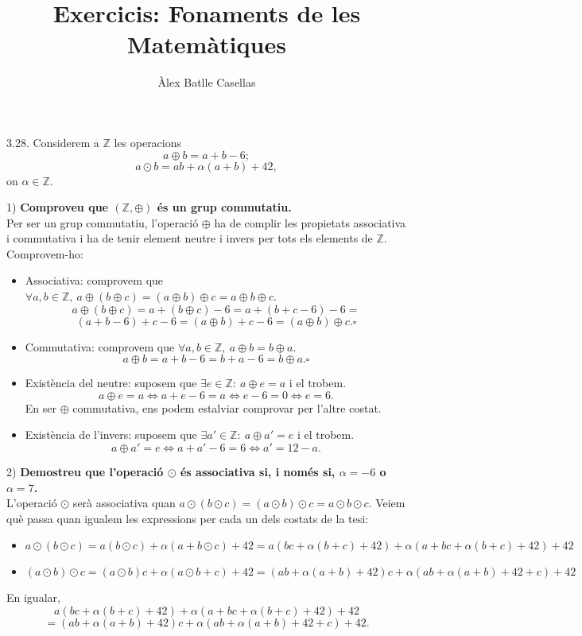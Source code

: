 \documentclass[11pt]{article}
\title{Exercicis: Fonaments de les Matemàtiques}
\author{Àlex Batlle Casellas}
\begin{document}
\begin{legal}
	\item[3.28.] Considerem a $\mathbb{Z}$ les operacions
	$$a\oplus b=a+b-6;$$
	$$a\odot b=ab+\alpha(a+b)+42,$$
	on $\alpha\in\mathbb{Z}$.
	\begin{legal}
		\item[1)] \textbf{Comproveu que $(\mathbb{Z},\oplus)$ és un grup commutatiu.}\\
		Per ser un grup commutatiu, l'operació $\oplus$ ha de complir les propietats associativa i commutativa i ha de tenir element neutre i invers per tots els elements de $\mathbb{Z}$. Comprovem-ho:
		\begin{itemize}
			\item Associativa: comprovem que $\forall a,b\in\mathbb{Z},\ a\oplus(b\oplus c)=(a\oplus b)\oplus c=a\oplus b\oplus c$.
			$$a\oplus(b\oplus c)=a+(b\oplus c)-6=a+(b+c-6)-6=$$
			$$(a+b-6)+c-6=(a\oplus b)+c-6=(a\oplus b)\oplus c.\square$$
			\item Commutativa: comprovem que $\forall a,b\in\mathbb{Z},\ a\oplus b=b\oplus a$.\\
			$$a\oplus b=a+b-6=b+a-6=b\oplus a.\square$$
			\item Existència del neutre: suposem que $\exists e\in\mathbb{Z}:\ a\oplus e=a$ i el trobem.
			$$a\oplus e=a\iff a+e-6=a\iff e-6=0\iff e=6.$$
			En ser $\oplus$ commutativa, ens podem estalviar comprovar per l'altre costat.
			\item Existència de l'invers: suposem que $\exists a'\in\mathbb{Z}:\ a\oplus a'=e$ i el trobem.
			$$a\oplus a'=e\iff a+a'-6=6\iff a'=12-a.$$
		\end{itemize}
		\item[2)] \textbf{Demostreu que l'operació $\odot$ és associativa si, i només si, $\alpha=-6$ o $\alpha=7$.}\\
		L'operació $\odot$ serà associativa quan $a\odot(b\odot c)=(a\odot b)\odot c=a\odot b\odot c$. Veiem què passa quan igualem les expressions per cada un dels costats de la tesi:
		\begin{itemize}
			\item $a\odot(b\odot c)=a(b\odot c)+\alpha(a+b\odot c)+42=a(bc+\alpha(b+c)+42)+\alpha(a+bc+\alpha(b+c)+42)+42$
			\item $(a\odot b)\odot c=(a\odot b)c+\alpha(a\odot b+c)+42=(ab+\alpha(a+b)+42)c+\alpha(ab+\alpha(a+b)+42+c)+42$
		\end{itemize}
		En igualar,
		$$
		a(bc+\alpha(b+c)+42)+\alpha(a+bc+\alpha(b+c)+42)+42
		$$
		$$
		=(ab+\alpha(a+b)+42)c+\alpha(ab+\alpha(a+b)+42+c)+42.
$$
\end{legal}
\end{legal}
\end{document}
